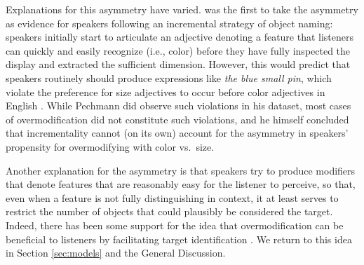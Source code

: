 \documentclass[11pt]{article}
\newcommand{\jd}[1]{\textcolor{Red}{[jd: #1]}}
\newcommand{\sectionref}[1]{Section \ref{#1}}
\begin{document}
Explanations for this asymmetry have varied.  was the first to take the asymmetry as evidence for speakers following an incremental strategy of object naming: speakers initially start to articulate an adjective denoting a feature that listeners can quickly and easily recognize (i.e., color) before they have fully inspected the display and extracted the sufficient dimension. However, this would predict that speakers routinely should produce expressions like \emph{the blue small pin}, which violate the preference for size adjectives to occur before color adjectives in English \cite{bloomfield1933, sproat1991}. While Pechmann did observe such violations in his dataset, most cases of overmodification did not constitute such violations, and he himself concluded that incrementality cannot (on its own) account for the asymmetry in speakers' propensity for overmodifying with color vs.~size. 


Another explanation for the asymmetry is that speakers try to produce modifiers that denote features that are reasonably easy for the listener to perceive, so that, even when a feature is not fully distinguishing in context, it at least serves to restrict the number of objects that could plausibly be considered the target. Indeed, there has been some support for the idea that overmodification can be beneficial to listeners by facilitating target identification \cite{Arts2011, rubiofernandez2016, Paraboni2007}. We return to this idea in \sectionref{sec:models} and the General Discussion.

\end{document}
